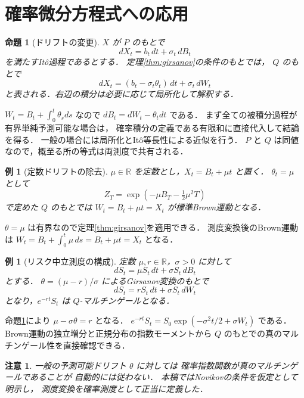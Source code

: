 \documentclass[a5paper,10pt,onecolumn]{jsarticle}
\makeatletter
\theoremstyle{mathnotetheorem}
\newtheorem{proposition}[theorem]{命題}
\newtheorem{example}[theorem]{例}
\newtheorem{remark}[theorem]{注意}
\renewcommand{\proofname}{証明}
\renewenvironment{proof}[1][\proofname]{%
  \par\pushQED{\qed}\normalfont\topsep4\p@\@plus2\p@\relax
  \trivlist\item[\hskip\labelsep\bfseries #1]\ignorespaces
}{\popQED\endtrivlist\@endpefalse}
\makeatother
\begin{document}
\section{確率微分方程式への応用}

\begin{proposition}[ドリフトの変更]\label{prop:drift}
$X$ が $P$ のもとで
\[
 dX_t=b_t\,dt+\sigma_t\,dB_t
\]
を満たすIt\^o過程であるとする．
定理\ref{thm:girsanov}の条件のもとでは，
$Q$ のもとで
\[
 dX_t=(b_t-\sigma_t\theta_t)\,dt+\sigma_t\,dW_t
\]
と表される．右辺の積分は必要に応じて局所化して解釈する．
\end{proposition}
\begin{proof}
$W_t=B_t+\int_0^t\theta_sds$ なので
$dB_t=dW_t-\theta_tdt$ である．
まず全ての被積分過程が有界単純予測可能な場合は，
確率積分の定義である有限和に直接代入して結論を得る．
一般の場合には局所化とIt\^o等長性による近似を行う．
$P$ と $Q$ は同値なので，概至る所の等式は両測度で共有される．
\end{proof}

\begin{example}[定数ドリフトの除去]
$\mu\in\mathbb R$ を定数とし，$X_t=B_t+\mu t$ と置く．
$\theta_t=\mu$ として
\[
 Z_T=\exp(-\mu B_T-\tfrac12\mu^2T)
\]
で定めた $Q$ のもとでは
$W_t=B_t+\mu t=X_t$ が標準Brown運動となる．
\end{example}
\begin{proof}
$\theta=\mu$ は有界なので定理\ref{thm:girsanov}を適用できる．
測度変換後のBrown運動は
$W_t=B_t+\int_0^t\mu\,ds=B_t+\mu t=X_t$
となる．
\end{proof}

\begin{example}[リスク中立測度の構成]
定数 $\mu,r\in\mathbb R$，$\sigma>0$ に対して
\[
 dS_t=\mu S_t\,dt+\sigma S_t\,dB_t
\]
とする．
$\theta=(\mu-r)/\sigma$ によるGirsanov変換のもとで
\[
 dS_t=rS_t\,dt+\sigma S_t\,dW_t
\]
となり，$e^{-rt}S_t$ は $Q$-マルチンゲールとなる．
\end{example}
\begin{proof}
命題\ref{prop:drift}により
$\mu-\sigma\theta=r$ となる．
$e^{-rt}S_t
 =S_0\exp(-\sigma^2t/2+\sigma W_t)$ である．
Brown運動の独立増分と正規分布の指数モーメントから
$Q$ のもとでの真のマルチンゲール性を直接確認できる．
\end{proof}

\begin{remark}
一般の予測可能ドリフト $\theta$ に対しては
確率指数関数が真のマルチンゲールであることが
自動的には従わない．
本稿ではNovikovの条件を仮定として明示し，
測度変換を確率測度として正当に定義した．
\end{remark}
\end{document}
